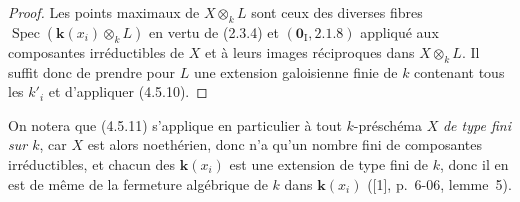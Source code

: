 \begin{proof}
Les points maximaux de $X\otimes_k L$ sont ceux des diverses fibres
$\operatorname{Spec}(\boldsymbol{k}(x_i)\otimes_k L)$ en vertu de (2.3.4) et
$(\mathbf{0}_{\mathrm I},2.1.8)$ appliqué aux composantes irréductibles de $X$ et à
leurs images réciproques dans $X\otimes_k L$. Il suffit donc de prendre pour
$L$ une extension galoisienne finie de $k$ contenant tous les $k'_i$ et
d'appliquer (4.5.10).
\end{proof}

On notera que (4.5.11) s'applique en particulier à tout $k$-préschéma $X$ \emph{de
type fini sur $k$}, car $X$ est alors noethérien, donc n'a qu'un nombre fini de
composantes irréductibles, et chacun des $\boldsymbol{k}(x_i)$ est une extension de type
fini de $k$, donc il en est de même de la fermeture algébrique de $k$ dans
$\boldsymbol{k}(x_i)$ ([1], p.~6-06, lemme~5).

